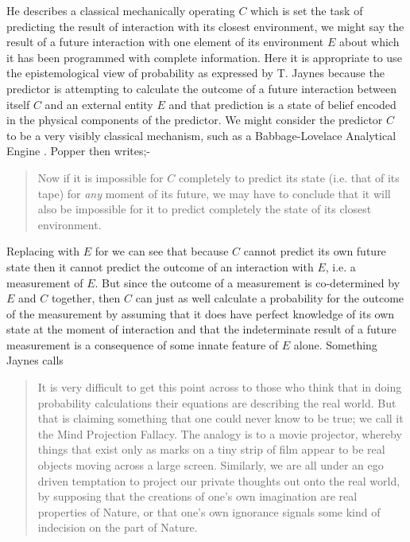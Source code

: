\documentclass{article}
\begin{document}
\par
He describes a classical mechanically operating  $C$ which is set the task of predicting the result of interaction with its closest environment, we might say the result of a future interaction with one element of its environment $E$ about which it has been programmed with complete information. Here it is appropriate to use the epistemological view of probability as expressed by T. Jaynes because the predictor is attempting to calculate the outcome of a future interaction between itself $C$ and an external entity $E$ and that prediction is a state of belief encoded in the physical components of the predictor. We might consider the predictor $C$ to be a very visibly classical mechanism, such as a Babbage-Lovelace Analytical Engine \autocite{Menabrea1843SketchBabbage}. Popper then writes;-
\begin{quotation}
  Now if it is impossible for $C$ completely to predict its state (i.e. that of its tape) for \emph{any} moment of its future, we may have to conclude that it will also be impossible for it to predict completely the state of its closest environment.
  \par
  \hfill \autocite[p.~178]{Popper1950b}
\end{quotation}
\par
Replacing  with $E$ for  we can see that because $C$ cannot predict its own future state then it cannot predict the outcome of an interaction with $E$, i.e. a measurement of $E$. But since the outcome of a measurement is co-determined by $E$ and $C$ together, then $C$ can just as well calculate a probability for the outcome of the measurement by assuming that it does have perfect knowledge of its own state at the moment of interaction and that the indeterminate result  of a future measurement is a consequence of some innate feature of $E$ alone. Something Jaynes calls  
\begin{quotation}
  It is very difficult to get this point across to those who think that in doing probability calculations their equations are describing the real world. But that is claiming something that one could never know to be true; we call it the Mind Projection Fallacy. The analogy is to a movie projector, whereby things that exist only as marks on a tiny strip of film appear to be real objects moving across a large screen. Similarly, we are all under an ego driven temptation to project our private thoughts out onto the real world, by supposing that the creations of one's own imagination are real properties of Nature, or that one's own ignorance signals some kind of indecision on the part of Nature.
  \hfill \autocite{Jaynes1989}
\end{quotation}
\end{document}
